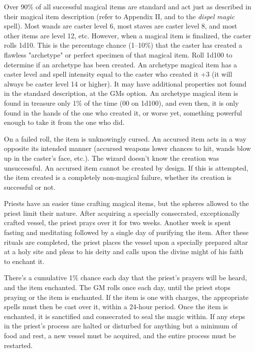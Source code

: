 \begin{multicols}{2}
Over 90\% of all successful magical items are standard and act just as described in their magical item description (refer to Appendix II, and to the \textit{dispel magic} spell).  Most wands are caster level 6, most staves are caster level 8, and most other items are level 12, etc. However, when a magical item is finalized, the caster rolls 1d10.  This is the percentage chance (1--10\%) that the caster has created a flawless "archetype" or perfect specimen of that magical item.  Roll 1d100 to determine if an archetype has been created.  An archetype magical item has a caster level and spell intensity equal to the caster who created it +3 (it will always be caster level 14 or higher).  It may have additional properties not found in the standard description, at the GMs option.  An archetype magical item is found in treasure only 1\% of the time (00 on 1d100), and even then, it is only found in the hands of the one who created it, or worse yet, something powerful enough to take it from the one who did. 

On a failed roll, the item is unknowingly cursed.  An accursed item acts in a way opposite its intended manner (accursed weapons lower chances to hit, wands blow up in the caster's face, etc.).  The wizard doesn't know the creation was unsuccessful.  An accursed item cannot be created by design.  If this is attempted, the item created is a completely non-magical failure, whether its creation is successful or not.  
 
Priests have an easier time crafting magical items, but the spheres allowed to the priest limit their nature.  After acquiring a specially consecrated, exceptionally crafted vessel, the priest prays over it for two weeks. Another week is spent fasting and meditating followed by a single day of purifying the item.  After these rituals are completed, the priest places the vessel upon a specially prepared altar at a holy site and pleas to his deity and calls upon the divine might of his faith to enchant it.  
 
There's a cumulative 1\% chance each day that the priest's prayers will be heard, and the item enchanted.  The GM rolls once each day, until the priest stops praying or the item is enchanted.  If the item is one with charges, the appropriate spells must then be cast over it, within a 24-hour period.  Once the item is enchanted, it is sanctified and consecrated to seal the magic within.  If any steps in the priest's process are halted or disturbed for anything but a minimum of food and rest, a new vessel must be acquired, and the entire process must be restarted.
 

\end{multicols}
